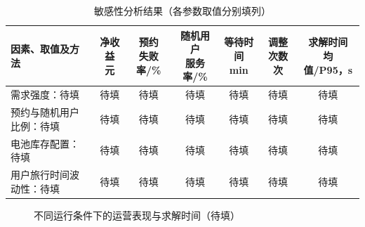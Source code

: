 \begin{table}[!htbp]
  \centering
  \caption{敏感性分析结果（各参数取值分别填列）}
  \label{exp:sensitivity_results}
  \small
  \setlength{\tabcolsep}{3pt}
  \begin{tabularx}{\linewidth}{@{}Xcccccc@{}}
    \toprule
    因素、取值及方法 & \shortstack{净收益\\元} & \shortstack{预约\\失败率/\%} & \shortstack{随机用户\\服务率/\%} & \shortstack{等待时间\\min} & \shortstack{调整次数\\次} & \shortstack{求解时间\\均值/P95，s} \\
    \midrule
    需求强度：待填 & 待填 & 待填 & 待填 & 待填 & 待填 & 待填 \\
    预约与随机用户比例：待填 & 待填 & 待填 & 待填 & 待填 & 待填 & 待填 \\
    电池库存配置：待填 & 待填 & 待填 & 待填 & 待填 & 待填 & 待填 \\
    用户旅行时间波动性：待填 & 待填 & 待填 & 待填 & 待填 & 待填 & 待填 \\
    \bottomrule
  \end{tabularx}
\end{table}

\begin{figure}[!htbp]
  \centering
  \caption{不同运行条件下的运营表现与求解时间（待填）}
  \label{exp:sensitivity_figure}
\end{figure}


